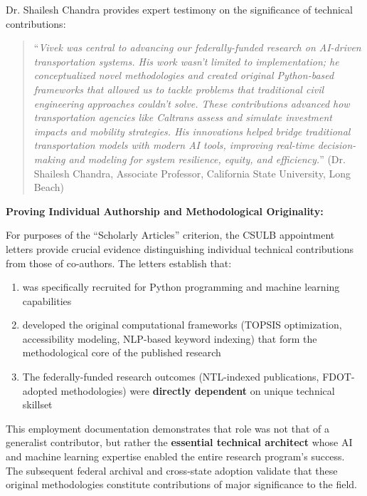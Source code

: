 Dr. Shailesh Chandra provides expert testimony on the significance of \drs technical contributions:

\begin{quote}
``\textit{Vivek was central to advancing our federally-funded research on AI-driven transportation systems. His work wasn't limited to implementation; he conceptualized novel methodologies and created original Python-based frameworks that allowed us to tackle problems that traditional civil engineering approaches couldn't solve. These contributions advanced how transportation agencies like Caltrans assess and simulate investment impacts and mobility strategies. His innovations helped bridge traditional transportation models with modern AI tools, improving real-time decision-making and modeling for system resilience, equity, and efficiency.}'' (Dr. Shailesh Chandra, Associate Professor, California State University, Long Beach) \cite{OR1B}
\end{quote}

\textbf{Proving Individual Authorship and Methodological Originality:}

For purposes of the ``Scholarly Articles'' criterion, the CSULB appointment letters provide crucial evidence distinguishing \drs individual technical contributions from those of co-authors. The letters establish that:

\begin{enumerate}
\item \dr was specifically recruited for Python programming and machine learning capabilities
\item \dr developed the original computational frameworks (TOPSIS optimization, accessibility modeling, NLP-based keyword indexing) that form the methodological core of the published research
\item The federally-funded research outcomes (NTL-indexed publications, FDOT-adopted methodologies) were \textbf{directly dependent} on \drs unique technical skillset
\end{enumerate}

This employment documentation demonstrates that \drs role was not that of a generalist contributor, but rather the \textbf{essential technical architect} whose AI and machine learning expertise enabled the entire research program's success. The subsequent federal archival and cross-state adoption validate that these original methodologies constitute contributions of major significance to the field.
